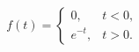 \documentclass{article}
\begin{document}
	\[
	f(t)=\begin{cases}
		0, & t<0,\\
		e^{-t}, & t>0.
	\end{cases}
	\]
\end{document}
